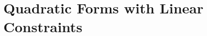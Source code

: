 \documentclass[11pt,fleqn]{book} %
\begin{document}
\section{Quadratic Forms with Linear Constraints}






\cleardoublepage %
\setlength{\columnsep}{0.75cm} %
\printindex %

\end{document}
